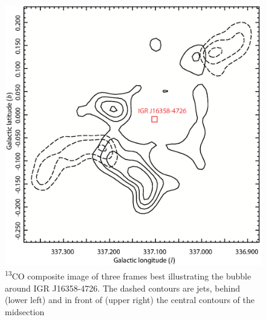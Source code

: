 \documentclass[a4paper, titlepage, oneside]{article}
\newcommand{\elem}[2]{\textsuperscript{#1}{#2}}
\begin{document}
\begin{multicols}{2}
\begin{figure}[H]
  \centering
  \includegraphics[width = \columnwidth]{figures/bubble34}
  \caption{\elem{13}{C}O composite image of three frames best illustrating the bubble around IGR J16358-4726. The dashed contours are jets, behind (lower left) and in front of (upper right) the central contours of the midsection}
  \label{fig:bubble34}
\end{figure}


\end{multicols}
\end{document}
